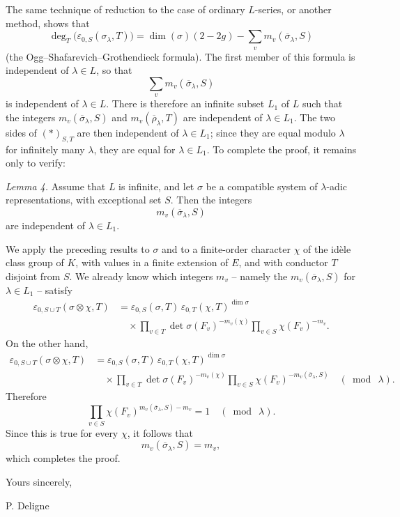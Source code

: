 \documentclass[11pt]{article}
\newcommand{\eps}{\varepsilon}
\begin{document}
The same technique of reduction to the case of ordinary \(L\)-series, or another method, shows that
\[
\deg_T\bigl(\eps_{0,S}(\sigma_\lambda,T)\bigr)
=
\dim(\sigma)(2-2g)-\sum_v m_v(\overline{\sigma}_\lambda,S)
\]
(the Ogg--Shafarevich--Grothendieck formula). The first member of this formula is independent of \(\lambda\in L\), so that
\[
\sum_v m_v(\overline{\sigma}_\lambda,S)
\]
is independent of \(\lambda\in L\). There is therefore an infinite subset \(L_1\) of \(L\) such that the integers \(m_v(\overline{\sigma}_\lambda,S)\) and \(m_v(\overline{\rho}_\lambda,T)\) are independent of \(\lambda\in L_1\). The two sides of \((*)_{S,T}\) are then independent of \(\lambda\in L_1\); since they are equal modulo \(\lambda\) for infinitely many \(\lambda\), they are equal for \(\lambda\in L_1\). To complete the proof, it remains only to verify:

\emph{Lemma 4.} Assume that \(L\) is infinite, and let \(\sigma\) be a compatible system of \(\lambda\)-adic representations, with exceptional set \(S\). Then the integers
\[
m_v(\overline{\sigma}_\lambda,S)
\]
are independent of \(\lambda\in L_1\).

We apply the preceding results to \(\sigma\) and to a finite-order character \(\chi\) of the idèle class group of \(K\), with values in a finite extension of \(E\), and with conductor \(T\) disjoint from \(S\). We already know which integers \(m_v\) -- namely the \(m_v(\overline{\sigma}_\lambda,S)\) for \(\lambda\in L_1\) -- satisfy
\[
\begin{aligned}
\eps_{0,S\cup T}(\sigma\otimes\chi,T)
&=\eps_{0,S}(\sigma,T)\,
  \eps_{0,T}(\chi,T)^{\dim\sigma} \\
&\quad\times
\prod_{v\in T}\det\sigma(F_v)^{-m_v(\chi)}
\prod_{v\in S}\chi(F_v)^{-m_v}.
\end{aligned}
\]
On the other hand,
\[
\begin{aligned}
\eps_{0,S\cup T}(\sigma\otimes\chi,T)
&=\eps_{0,S}(\sigma,T)\,
  \eps_{0,T}(\chi,T)^{\dim\sigma} \\
&\quad\times
\prod_{v\in T}\det\sigma(F_v)^{-m_v(\chi)}
\prod_{v\in S}\chi(F_v)^{-m_v(\overline{\sigma}_\lambda,S)}
\quad(\bmod\ \lambda).
\end{aligned}
\]
Therefore
\[
\prod_{v\in S}\chi(F_v)^{m_v(\overline{\sigma}_\lambda,S)-m_v}
=1\quad(\bmod\ \lambda).
\]
Since this is true for every \(\chi\), it follows that
\[
m_v(\overline{\sigma}_\lambda,S)=m_v,
\]
which completes the proof.

Yours sincerely,

\hfill P. Deligne
\end{document}
